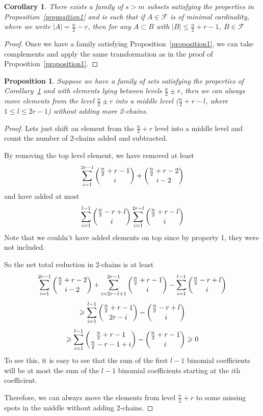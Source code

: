 \documentclass[12pt]{article}
\theoremstyle{plain}
\newtheorem{corollary}[theorem]{Corollary}
\newtheorem{proposition}[theorem]{Proposition}
\theoremstyle{definition}
\theoremstyle{remark}
\newcommand{\F}{\mathcal{F}}
\begin{document}
\begin{corollary}
\label{cor1}
There exists a family of $s > m$ subsets satisfying the properties in Proposition~\ref{proposition1} and is such that if $A \in \F$ is of minimal cardinality, where we write $|A|=\frac{n}{2}-r$, then for any $A \subset B$ with $|B| \leq \frac{n}{2}+r-1$, $B \in \F$
\end{corollary}

\begin{proof}
Once we have a family satisfying Proposition~\ref{proposition1}, we can take complements and apply the same transformation as in the proof of Proposition~\ref{proposition1}.
\end{proof}

\begin{proposition}
\label{proposition2}
Suppose we have a family of sets satisfying the properties of Corollary~\ref{cor1} and with elements lying between levels $\frac{n}{2}\pm r$, then we can always move elements from the level $\frac{n}{2} \pm r$ into a middle level ($\frac{n}{2} + r - l$, where $1 \leq l \leq 2r-1$) without adding more 2-chains. 
\end{proposition}

\begin{proof}
Lets just shift an element from the $\frac{n}{2} + r$ level into a middle level and count the number of 2-chains added and subtracted. 

By removing the top level element, we have removed at least
\[ \sum_{i=1}^{2r-1} \dbinom{\frac{n}{2} +r-1}{i} + \dbinom{\frac{n}{2} + r-2}{i-2} \]
and have added at most
\[ \sum_{i=1}^{l-1}\dbinom{\frac{n}{2}-r + l}{i} \sum_{i=1}^{2r-l} \dbinom{\frac{n}{2}+r-l}{i} \]
Note that we couldn't have added elements on top since by property 1, they were not included.

So the net total reduction in 2-chains is at least
\[ \sum_{i=1}^{2r-1} \dbinom{\frac{n}{2}+r-2}{i-2} + \sum_{i=2r-l+1}^{2r-1} \dbinom{\frac{n}{2}+r-1}{i} - \sum_{i=1}^{l-1} \dbinom{\frac{n}{2}-r+l}{i}\]
\[ \geq \sum_{i=1}^{l-1} \dbinom{\frac{n}{2}+r-1}{2r-i} - \dbinom{\frac{n}{2}-r+l}{i} \]
\[ \geq \sum_{i=1}^{l-1} \dbinom{\frac{n}{2}+r-1}{\frac{n}{2}-r-1+i} - \dbinom{\frac{n}{2}+r-1}{i} \geq 0 \]
To see this, it is easy to see that the sum of the first $l-1$ binomial coefficients will be at most the sum of the $l-1$ binomial coefficients starting at the $i$th coefficient.

Therefore, we can always move the elements from level $\frac{n}{2}+r$ to some missing spots in the middle without adding 2-chains. 
\end{proof}
\end{document}
